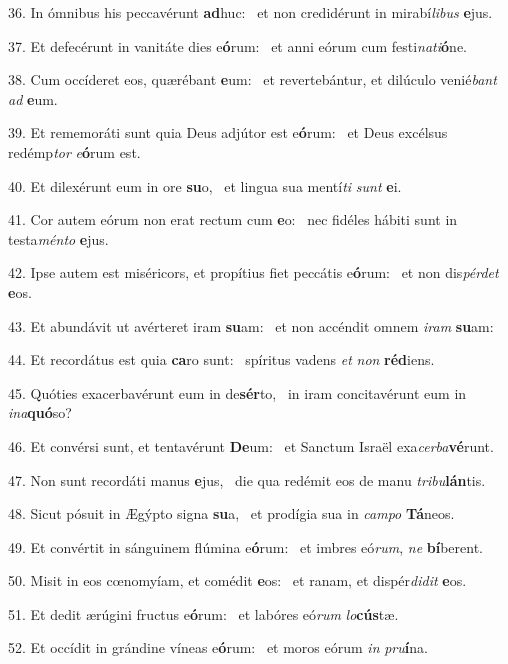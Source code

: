 36. In ómnibus his peccavérunt \textbf{ad}huc: \ast\  et non credidérunt in mirabí\textit{li}\textit{bus} \textbf{e}jus.\

37. Et defecérunt in vanitáte dies e\textbf{ó}rum: \ast\  et anni eórum cum festi\textit{na}\textit{ti}\textbf{ó}ne.\

38. Cum occíderet eos, quærébant \textbf{e}um: \ast\  et revertebántur, et dilúculo venié\textit{bant} \textit{ad} \textbf{e}um.\

39. Et rememoráti sunt quia Deus adjútor est e\textbf{ó}rum: \ast\  et Deus excélsus redémp\textit{tor} \textit{e}\textbf{ó}rum est.\

40. Et dilexérunt eum in ore \textbf{su}o, \ast\  et lingua sua mentí\textit{ti} \textit{sunt} \textbf{e}i.\

41. Cor autem eórum non erat rectum cum \textbf{e}o: \ast\  nec fidéles hábiti sunt in testa\textit{mén}\textit{to} \textbf{e}jus.\

42. Ipse autem est miséricors, et propítius fiet peccátis e\textbf{ó}rum: \ast\  et non dis\textit{pér}\textit{det} \textbf{e}os.\

43. Et abundávit ut avérteret iram \textbf{su}am: \ast\  et non accéndit omnem \textit{i}\textit{ram} \textbf{su}am:\

44. Et recordátus est quia \textbf{ca}ro sunt: \ast\  spíritus vadens \textit{et} \textit{non} \textbf{réd}iens.\

45. Quóties exacerbavérunt eum in de\textbf{sér}to, \ast\  in iram concitavérunt eum in \textit{in}\textit{a}\textbf{quó}so?\

46. Et convérsi sunt, et tentavérunt \textbf{De}um: \ast\  et Sanctum Israël exa\textit{cer}\textit{ba}\textbf{vé}runt.\

47. Non sunt recordáti manus \textbf{e}jus, \ast\  die qua redémit eos de manu \textit{tri}\textit{bu}\textbf{lán}tis.\

48. Sicut pósuit in Ægýpto signa \textbf{su}a, \ast\  et prodígia sua in \textit{cam}\textit{po} \textbf{Tá}neos.\

49. Et convértit in sánguinem flúmina e\textbf{ó}rum: \ast\  et imbres eó\textit{rum}, \textit{ne} \textbf{bí}berent.\

50. Misit in eos cœnomyíam, et comédit \textbf{e}os: \ast\  et ranam, et dispér\textit{di}\textit{dit} \textbf{e}os.\

51. Et dedit ærúgini fructus e\textbf{ó}rum: \ast\  et labóres eó\textit{rum} \textit{lo}\textbf{cús}tæ.\

52. Et occídit in grándine víneas e\textbf{ó}rum: \ast\  et moros eórum \textit{in} \textit{pru}\textbf{í}na.\

